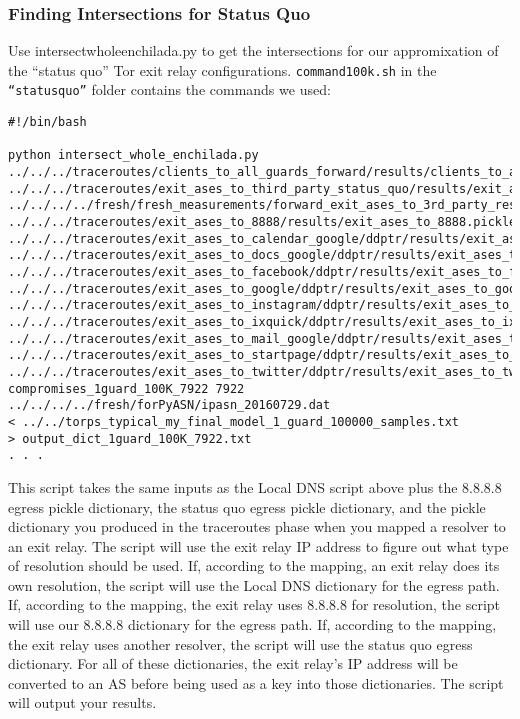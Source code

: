\documentclass{article}
\begin{document}
\subsubsection{Finding Intersections for Status Quo}
Use intersect\textunderscore whole\textunderscore enchilada.py to get the 
intersections for our appromixation of the ``status quo'' Tor exit relay 
configurations. {\tt command\textunderscore 100k.sh} in the 
{\tt ``status\textunderscore quo''} folder contains the commands we used:
\begin{lstlisting}
#!/bin/bash

python intersect_whole_enchilada.py 
../../../traceroutes/clients_to_all_guards_forward/results/clients_to_all_guards_forward_dict.pickle 
../../../traceroutes/exit_ases_to_third_party_status_quo/results/exit_ases_to_third_party.pickle 
../../../../fresh/fresh_measurements/forward_exit_ases_to_3rd_party_resolvers/final_exit_ip_to_one_resolver_list_dict.pickle 
../../../traceroutes/exit_ases_to_8888/results/exit_ases_to_8888.pickle 
../../../traceroutes/exit_ases_to_calendar_google/ddptr/results/exit_ases_to_calendar_google_ddptr.pickle 
../../../traceroutes/exit_ases_to_docs_google/ddptr/results/exit_ases_to_docs_google_ddptr.pickle 
../../../traceroutes/exit_ases_to_facebook/ddptr/results/exit_ases_to_facebook_ddptr.pickle 
../../../traceroutes/exit_ases_to_google/ddptr/results/exit_ases_to_google_ddptr.pickle 
../../../traceroutes/exit_ases_to_instagram/ddptr/results/exit_ases_to_instagram_ddptr.pickle 
../../../traceroutes/exit_ases_to_ixquick/ddptr/results/exit_ases_to_ixquick_ddptr.pickle 
../../../traceroutes/exit_ases_to_mail_google/ddptr/results/exit_ases_to_mail_google_ddptr.pickle 
../../../traceroutes/exit_ases_to_startpage/ddptr/results/exit_ases_to_startpage_ddptr.pickle 
../../../traceroutes/exit_ases_to_twitter/ddptr/results/exit_ases_to_twitter_ddptr.pickle 
compromises_1guard_100K_7922 7922 ../../../../fresh/forPyASN/ipasn_20160729.dat 
< ../../torps_typical_my_final_model_1_guard_100000_samples.txt 
> output_dict_1guard_100K_7922.txt
. . .
\end{lstlisting}
This script 
takes the same inputs as the Local DNS script above plus the 8.8.8.8 egress 
pickle dictionary, the status quo egress pickle dictionary, and the pickle 
dictionary you produced in the traceroutes phase when you mapped a resolver to an 
exit relay. The script will use the exit relay IP address to figure out what type of 
resolution should be used. If, according to the mapping, an exit relay does its own 
resolution, the script will use the Local DNS dictionary for the egress path. If, 
according to the mapping, the exit relay uses 8.8.8.8 for resolution, the script will 
use our 8.8.8.8 dictionary for the egress path. If, according to the mapping, the exit 
relay uses another resolver, the script will use the status quo egress dictionary. For 
all of these dictionaries, the exit relay's IP address will be converted to an AS before 
being used as a key into those dictionaries. The script will output your results.
\end{document}

